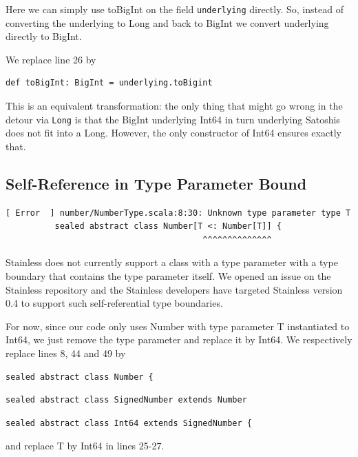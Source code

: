 \documentclass[runningheads]{llncs}
\begin{document}
Here we can simply use toBigInt on the field \texttt{underlying}
directly.  So, instead of converting the underlying to Long and back
to BigInt we convert underlying directly to BigInt.

We replace line 26 by
\begin{lstlisting}[style=scala]
def toBigInt: BigInt = underlying.toBigint
\end{lstlisting}

This is an equivalent transformation: the only thing that might go
wrong in the detour via \texttt{Long} is that the BigInt underlying
Int64 in turn underlying Satoshis does not fit into a Long. However,
the only constructor of Int64 ensures exactly that.

\subsection{Self-Reference in Type Parameter Bound}

\begin{lstlisting}[style=stainless]
[ Error  ] number/NumberType.scala:8:30: Unknown type parameter type T
          sealed abstract class Number[T <: Number[T]] {
                                        ^^^^^^^^^^^^^^
\end{lstlisting}

Stainless does not currently support a class with a type parameter
with a type boundary that contains the type parameter itself. We opened an
issue \cite{Stainless:issue519} on the Stainless repository and the
Stainless developers have targeted Stainless version 0.4 to support
such self-referential type boundaries.

For now, since our code only uses Number with type parameter T
instantiated to Int64, we just remove the type parameter and replace
it by Int64. We respectively replace lines 8, 44 and 49 by
\begin{lstlisting}[style=scala]
sealed abstract class Number {
\end{lstlisting}

\begin{lstlisting}[style=scala]
sealed abstract class SignedNumber extends Number
\end{lstlisting}

\begin{lstlisting}[style=scala]
sealed abstract class Int64 extends SignedNumber {
\end{lstlisting}

and replace T by Int64 in lines 25-27.
\end{document}
